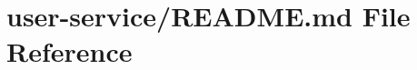 \hypertarget{user-service_2_r_e_a_d_m_e_8md}{}\section{user-\/service/\+R\+E\+A\+D\+ME.md File Reference}
\label{user-service_2_r_e_a_d_m_e_8md}
